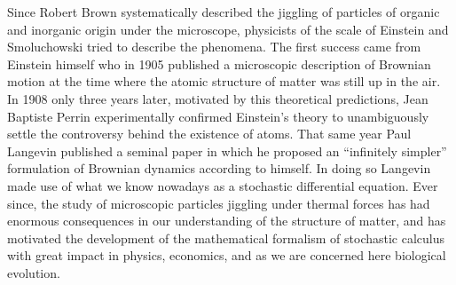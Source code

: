 Since Robert Brown systematically described the jiggling of particles of
organic and inorganic origin under the microscope, physicists of the scale of
Einstein and Smoluchowski tried to describe the phenomena. The first success
came from Einstein himself who in 1905 published a microscopic description of
Brownian motion at the time where the atomic structure of matter was still up
in the air. In 1908 only three years later, motivated by this theoretical
predictions, Jean Baptiste Perrin experimentally confirmed Einstein's theory to
unambiguously settle the controversy behind the existence of atoms. That same
year Paul Langevin published a seminal paper in which he proposed an
``infinitely simpler'' formulation of Brownian dynamics according to himself.
In doing so Langevin made use of what we know nowadays as a stochastic
differential equation. Ever since, the study of microscopic particles jiggling
under thermal forces has had enormous consequences in our understanding of the
structure of matter, and has motivated the development of the mathematical
formalism of stochastic calculus with great impact in physics, economics, and
as we are concerned here biological evolution.

